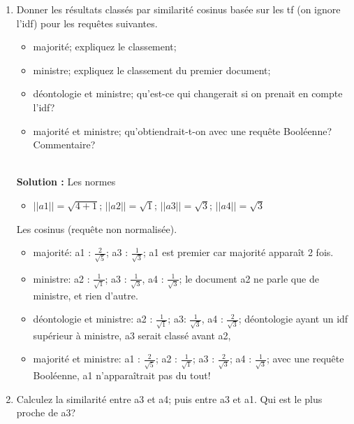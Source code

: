 \documentclass[11pt,a4paper]{article}
\newenvironment{solution}[0]{
~\\ \color{red} \textbf{Solution :}\color{black}}{%
}
\begin{document}
\begin{enumerate}
  \item Donner les résultats classés par similarité cosinus basée sur les tf (on ignore l'idf) pour les requêtes suivantes.
  
  \begin{itemize}
    \item majorité; expliquez le classement;
    \item ministre; expliquez le classement du premier document;
    \item déontologie et ministre;  qu'est-ce
         qui changerait si on prenait en compte l'idf?
    \item majorité et ministre; qu'obtiendrait-t-on avec une requête Booléenne? Commentaire?
  \end{itemize}
\begin{solution}
Les normes
\begin{itemize}
  \item $||a1|| = \sqrt{4+ 1}$; $||a2|| = \sqrt{1}$; $||a3|| = \sqrt{3}$; $||a4|| = \sqrt{3}$ 
\end{itemize}

Les cosinus (requête non normalisée).

\begin{itemize}
  \item majorité: a1 : $\frac{2}{\sqrt{5}}$;  a3 : $\frac{1}{\sqrt{3}}$; a1 est premier car majorité apparaît 2 fois.
  
  \item ministre: a2 : $\frac{1}{\sqrt{1}}$;  a3 : $\frac{1}{\sqrt{3}}$,  a4 : $\frac{1}{\sqrt{3}}$; le document a2 ne
      parle que de ministre, et rien d'autre.
  
  \item déontologie et ministre: a2 : $\frac{1}{\sqrt{1}}$;  a3: $\frac{1}{\sqrt{3}}$, 
          a4 : $\frac{2}{\sqrt{3}}$;
     déontologie ayant un idf supérieur à ministre, a3 serait classé avant a2, 
  
  \item majorité et ministre: a1 : $\frac{2}{\sqrt{5}}$;  a2 : $\frac{1}{\sqrt{1}}$; a3 : $\frac{2}{\sqrt{3}}$; 
  a4 : $\frac{1}{\sqrt{3}}$; avec une requête Booléenne, a1 n'apparaîtrait pas du tout!
    
\end{itemize}

\end{solution}  

   \item Calculez la similarité entre a3 et a4; puis entre a3 et a1. Qui est le plus proche de a3?
   

\end{enumerate}
\end{document}
